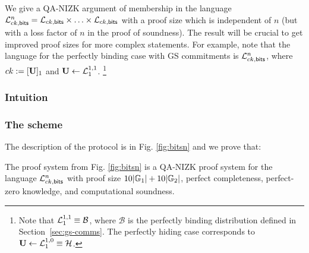 We give a QA-NIZK argument of membership in the language $\mathcal{L}_{ck,\mathsf{bits}}^n  = \mathcal{L}_{ck,\mathsf{bits}} \times \ldots \times \mathcal{L}_{ck,\mathsf{bits}}$ with a proof size which is independent of $n$ (but with a loss factor of $n$ in the proof of soundness). The result will be crucial to get improved proof sizes for more complex statements. For example, note that the language for the perfectly binding case with GS commitments is $\mathcal{L}_{ck,\mathsf{bits}}^n$, where $ck:=[\mathbf{{U}}]_1$ and $\mathbf{{U}}\gets\mathcal{L}_1^{1,1}$. \footnote{Note that $\mathcal{L}_1^{1,1}\equiv\mathcal{B}$, where $\mathcal{B}$ is the perfectly binding distribution defined in Section~\ref{sec:gs-comms}. The perfectly hiding case corresponds to $\mathbf{{U}}\gets\mathcal{L}_1^{1,0}\equiv\mathcal{H}$.}

\subsubsection{Intuition}


\subsubsection{The scheme}

The description of the protocol is in Fig. \ref{fig:bitsn} and  we prove that:

\begin{theorem} \label{theo:bitsnm} The proof system from Fig. \ref{fig:bitsn} is a QA-NIZK proof system for the language $\mathcal{L}_{ck,\mathsf{bits}}^n$ with proof size  
$10|\mathbb{G}_1|+10|\mathbb{G}_2|$, perfect completeness, perfect-zero knowledge, and computational soundness. 
\end{theorem}

